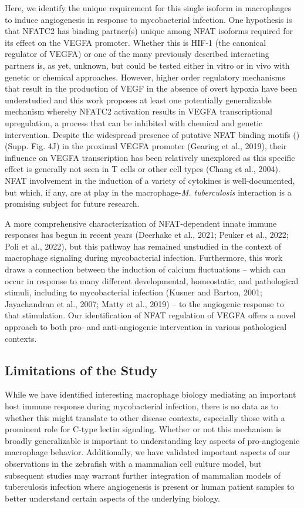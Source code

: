 Here, we identify the unique requirement for this single isoform in macrophages to induce angiogenesis in response to mycobacterial infection. One hypothesis is that NFATC2 has binding partner(s) unique among NFAT isoforms required for its effect on the VEGFA promoter. Whether this is HIF-1\textalpha{} (the canonical regulator of VEGFA) or one of the many previously described interacting partners is, as yet, unknown, but could be tested either in vitro or in vivo with genetic or chemical approaches. However, higher order regulatory mechanisms that result in the production of VEGF in the absence of overt hypoxia have been understudied and this work proposes at least one potentially generalizable mechanism whereby NFATC2 activation results in VEGFA transcriptional upregulation, a process that can be inhibited with chemical and genetic intervention. Despite the widespread presence of putative NFAT binding motifs () (Supp. Fig. 4J) in the proximal VEGFA promoter (Gearing et al., 2019), their influence on VEGFA transcription has been relatively unexplored as this specific effect is generally not seen in T cells or other cell types (Chang et al., 2004). NFAT involvement in the induction of a variety of cytokines is well-documented, but which, if any, are at play in the macrophage-\textit{M. tuberculosis} interaction is a promising subject for future research. 

A more comprehensive characterization of NFAT-dependent innate immune responses has begun in recent years (Deerhake et al., 2021; Peuker et al., 2022; Poli et al., 2022), but this pathway has remained unstudied in the context of macrophage signaling during mycobacterial infection. Furthermore, this work draws a connection between the induction of calcium fluctuations -- which can occur in response to many different developmental, homeostatic, and pathological stimuli, including to mycobacterial infection (Kusner and Barton, 2001; Jayachandran et al., 2007; Matty et al., 2019) -- to the angiogenic response to that stimulation. Our identification of NFAT regulation of VEGFA offers a novel approach to both pro- and anti-angiogenic intervention in various pathological contexts.

\subsection{Limitations of the Study}

While we have identified interesting macrophage biology mediating an important host immune response during mycobacterial infection, there is no data as to whether this might translate to other disease contexts, especially those with a prominent role for C-type lectin signaling. Whether or not this mechanism is broadly generalizable is important to understanding key aspects of pro-angiogenic macrophage behavior. Additionally, we have validated important aspects of our observations in the zebrafish with a mammalian cell culture model, but subsequent studies may warrant further integration of mammalian models of tuberculosis infection where angiogenesis is present or human patient samples to better understand certain aspects of the underlying biology.



